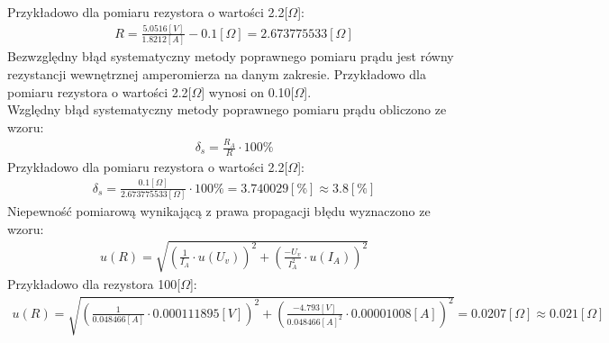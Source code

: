\documentclass[11pt]{article}
\begin{document}
    Przykładowo dla pomiaru rezystora o wartości 2.2[$\Omega$]:
    \begin{gather*}
        R=\frac{5.0516[V]}{1.8212[A]}-0.1[\Omega]=2.673775533[\Omega]
    \end{gather*}
    Bezwzględny błąd systematyczny metody poprawnego pomiaru prądu jest równy rezystancji wewnętrznej amperomierza na danym zakresie.
    Przykładowo dla pomiaru rezystora o wartości 2.2[$\Omega$] wynosi on 0.10[$\Omega$].\\
    Względny błąd systematyczny metody poprawnego pomiaru prądu obliczono ze wzoru:
    \begin{gather*}
        \delta_s=\frac{R_A}{R}\cdot 100\%
    \end{gather*}
    Przykładowo dla pomiaru rezystora o wartości 2.2[$\Omega$]:
    \begin{gather*}
        \delta_s=\frac{0.1[\Omega]}{2.673775533[\Omega]}\cdot 100\%=3.740029[\%]\approx 3.8[\%]
    \end{gather*}
    Niepewność pomiarową wynikającą z prawa propagacji błędu wyznaczono ze wzoru:
    \begin{gather*}
        u(R)=\sqrt{(\frac{1}{I_A}\cdot u(U_v))^2+(\frac{-U_v}{I_A^2}\cdot u(I_A))^2}
    \end{gather*}
    Przykładowo dla rezystora 100[$\Omega$]:
    \begin{gather*}
        u(R)=\sqrt{(\frac{1}{0.048466[A]}\cdot 0.000111895[V])^2+(\frac{-4.793[V]}{0.048466[A]^2}\cdot 0.00001008[A])^2}=0.0207[\Omega]\approx 0.021[\Omega]
    \end{gather*}
\end{document}
